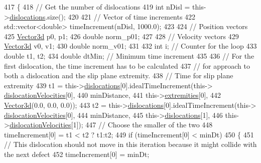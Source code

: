\begin{DoxyCode}
417  \{
418    \textcolor{comment}{// Get the number of dislocations}
419    \textcolor{keywordtype}{int} nDisl = this->\hyperlink{classSlipPlane_ad92c7c409f7e161db449528389180910}{dislocations}.size();
420 
421    \textcolor{comment}{// Vector of time increments}
422    std::vector<double> timeIncrement(nDisl, 1000.0);
423 
424    \textcolor{comment}{// Position vectors}
425    \hyperlink{classVector3d}{Vector3d} p0, p1;
426    \textcolor{keywordtype}{double} norm\_p01;
427 
428    \textcolor{comment}{// Velocity vectors}
429    \hyperlink{classVector3d}{Vector3d} v0, v1;
430    \textcolor{keywordtype}{double} norm\_v01;
431 
432    \textcolor{keywordtype}{int} i;         \textcolor{comment}{// Counter for the loop}
433    \textcolor{keywordtype}{double} t1, t2;
434    \textcolor{keywordtype}{double} dtMin;  \textcolor{comment}{// Minimum time increment}
435 
436    \textcolor{comment}{// For the first dislocation, the time increment has to be calculated}
437    \textcolor{comment}{// for approach to both a dislocation and the slip plane extremity.}
438    \textcolor{comment}{// Time for slip plane extremity}
439    t1 = this->\hyperlink{classSlipPlane_ad92c7c409f7e161db449528389180910}{dislocations}[0].idealTimeIncrement(this->
      \hyperlink{classSlipPlane_a107a3883169bf918664cb4e4fd4bd72c}{dislocationVelocities}[0],
440                                                  minDistance,
441                                                  this->\hyperlink{classSlipPlane_abbdbe6ed805faf3777b54ff55a9c089c}{extremities}[0],
442                                                  \hyperlink{classVector3d}{Vector3d}(0.0, 0.0, 0.0));
443    t2 = this->\hyperlink{classSlipPlane_ad92c7c409f7e161db449528389180910}{dislocations}[0].idealTimeIncrement(this->
      \hyperlink{classSlipPlane_a107a3883169bf918664cb4e4fd4bd72c}{dislocationVelocities}[0],
444                                                  minDistance,
445                                                  this->\hyperlink{classSlipPlane_ad92c7c409f7e161db449528389180910}{dislocations}[1],
446                                                  this->\hyperlink{classSlipPlane_a107a3883169bf918664cb4e4fd4bd72c}{dislocationVelocities}[1]);
447    \textcolor{comment}{// Choose the smaller of the two}
448    timeIncrement[0] = t1 < t2 ? t1:t2;
449    \textcolor{keywordflow}{if} (timeIncrement[0] < minDt)
450      \{
451        \textcolor{comment}{// This dislocation should not move in this iteration because it might collide with the next defect}
452        timeIncrement[0] = minDt;

\end{DoxyCode}
